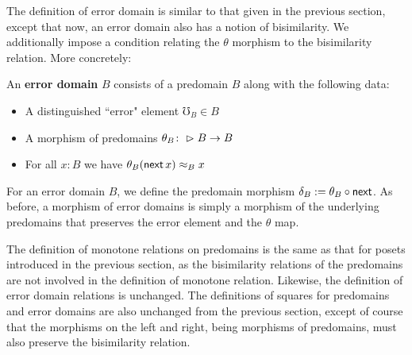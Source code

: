 The definition of error domain is similar to that given in the previous section,
except that now, an error domain also has a notion of bisimilarity. We
additionally impose a condition relating the $\theta$ morphism to the
bisimilarity relation. More concretely:
%
\begin{definition}
An \textbf{error domain} $B$ consists of a predomain $B$ along with the following data:
\begin{itemize}
    \item A distinguished ``error" element $\mho_B \in B$
    \item A morphism of predomains $\theta_B \colon \vartriangleright B \to B$
    \item For all $x : B$ we have $\theta_B(\mathsf{next}\, x) \approx_B x$
\end{itemize}
\end{definition}
%
For an error domain $B$, we define the predomain morphism $\delta_B := \theta_B
\circ \mathsf{next}$.
%
As before, a morphism of error domains is simply a morphism of the underlying
predomains that preserves the error element and the $\theta$ map.

%
The definition of monotone relations on predomains is the same as that for
posets introduced in the previous section, as the bisimilarity relations of the
predomains are not involved in the definition of monotone relation. Likewise,
the definition of error domain relations is unchanged.
%
The definitions of squares for predomains and error domains are also unchanged
from the previous section, except of course that the morphisms on the left and
right, being morphisms of predomains, must also preserve the bisimilarity
relation.

